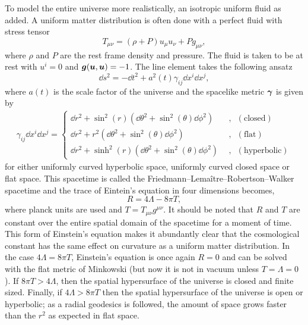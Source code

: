 To model the entire universe more realistically, an isotropic uniform fluid as added. A uniform matter distribution is often done with a perfect fluid with stress tensor
\begin{equation}
T_{\mu\nu} = (\rho+P)u_\mu u_\nu + Pg_{\mu\nu},
\end{equation}
where $\rho$ and $P$ are the rest frame density and pressure. The fluid is taken to be at rest with $u^i =0$ and $\boldsymbol{g}(\boldsymbol{u},\boldsymbol{u})=-1$. The line element takes the following ansatz
\begin{equation}
\dd s^2 = -\dd t^2 + a^2(t) \gamma_{ij} \dd x^i \dd x^j,
\end{equation}
where $a(t)$ is the scale factor of the universe and the spacelike metric $\boldsymbol{\gamma}$ is given by
\begin{align}
\gamma_{ij} \dd x^i \dd x^j = 
\left\{
\begin{array}{ll}
{\dd r^2} + \sin^2(r) \left(\dd \theta^2 + \sin^2(\theta) \dd \phi^2 \right)\quad&, \,\,\,(\mathrm{closed}) \\
\dd r^2 + r^2 \left(\dd \theta^2 + \sin^2(\theta) \dd \phi^2 \right)\,\quad\quad&, \,\,\,(\mathrm{flat}) \\
{\dd r^2} + \sinh^2(r) \left(\dd \theta^2 + \sin^2(\theta) \dd \phi^2 \right)&, \,\,\,(\mathrm{hyperbolic} )
\end{array}
\end{align}
for either uniformly curved hyperbolic space, uniformly curved closed space or flat space. This spacetime is called the Friedmann–Lemaître–Robertson–Walker spacetime and the trace of Eintein's equation in four dimensions becomes,
\begin{equation}
R = 4\Lambda -8\pi T,
\end{equation}
where planck units are used and $T=T_{\mu\nu}g^{\mu\nu}$. It should be noted that $R$ and $T$ are constant over the entire spatial domain of the spacetime for a moment of time. This form of Einstein's equation makes it abundantly clear that the cosmological constant has the same effect on curvature as a uniform matter distribution. In the case $4 \Lambda = 8 \pi T$, Einstein's equation is once again $R=0$ and can be solved with the flat metric of Minkowski (but now it is not in vacuum unless $T=\Lambda=0$). If $8\pi T> 4\Lambda$, then the spatial hypersurface of the universe is closed and finite sized. Finally, if $4\Lambda > 8 \pi T$ then the spatial hypersurface of the universe is open or hyperbolic; as a radial geodesics is followed, the amount of space grows faster than the $r^2$ as expected in flat space.

